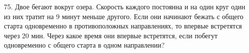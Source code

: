 75. Двое бегают вокруг озера. Скорость каждого постоянна и на один круг один из них тратит на 9 минут меньше другого. Если они начинают бежать с общего старта одновременно в противоположных направлениях, то впервые встретятся через 20 мин. Через какое время они впервые встретятся, если побегут одновременно с общего старта в одном направлении?\\
